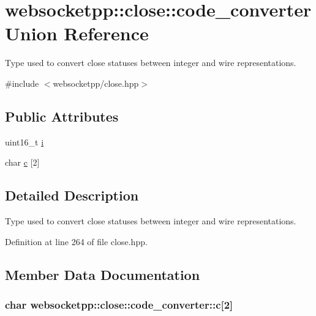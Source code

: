 \hypertarget{unionwebsocketpp_1_1close_1_1code__converter}{}\section{websocketpp\+:\+:close\+:\+:code\+\_\+converter Union Reference}
\label{unionwebsocketpp_1_1close_1_1code__converter}


Type used to convert close statuses between integer and wire representations.  




{\ttfamily \#include $<$websocketpp/close.\+hpp$>$}

\subsection*{Public Attributes}
\begin{DoxyCompactItemize}
\item 
uint16\+\_\+t \hyperlink{unionwebsocketpp_1_1close_1_1code__converter_aa8ed980b85e36e51a24f7eb95c2c3bf7}{i}
\item 
char \hyperlink{unionwebsocketpp_1_1close_1_1code__converter_ad9a9b5ad77cd94c1ac521a3524e42962}{c} \mbox{[}2\mbox{]}
\end{DoxyCompactItemize}


\subsection{Detailed Description}
Type used to convert close statuses between integer and wire representations. 

Definition at line 264 of file close.\+hpp.



\subsection{Member Data Documentation}
\hypertarget{unionwebsocketpp_1_1close_1_1code__converter_ad9a9b5ad77cd94c1ac521a3524e42962}{}
\subsubsection[{c}]{\setlength{\rightskip}{0pt plus 5cm}char websocketpp\+::close\+::code\+\_\+converter\+::c\mbox{[}2\mbox{]}}\label{unionwebsocketpp_1_1close_1_1code__converter_ad9a9b5ad77cd94c1ac521a3524e42962}


